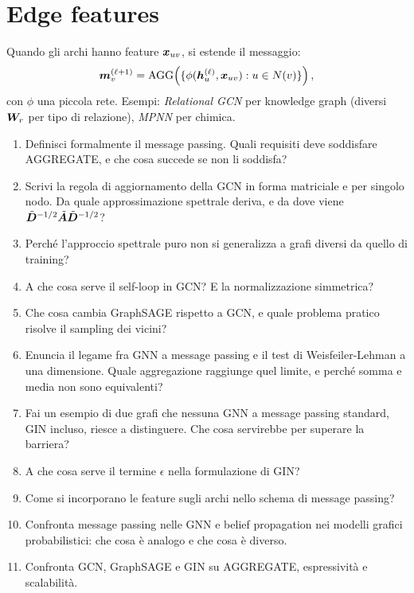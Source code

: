 \section{Edge features}

Quando gli archi hanno feature $\bm{x}_{uv}$, si estende il messaggio:
\[
\bm{m}_v^{(\ell+1)} = \mathrm{AGG}\!\left(\{\phi(\bm{h}_u^{(\ell)}, \bm{x}_{uv}) : u\in N(v)\}\right),
\]
con $\phi$ una piccola rete. Esempi: \emph{Relational GCN} per knowledge graph (diversi $\bm{W}_r$ per tipo di relazione), \emph{MPNN} per chimica.

\begin{tcolorbox}[mywarn, title={Domande d'esame — Message passing e GNN convoluzionali}]
\begin{enumerate}
  \item Definisci formalmente il message passing. Quali requisiti deve soddisfare AGGREGATE, e che cosa succede se non li soddisfa?
  \item Scrivi la regola di aggiornamento della GCN in forma matriciale e per singolo nodo. Da quale approssimazione spettrale deriva, e da dove viene $\tilde{\bm{D}}^{-1/2}\tilde{\bm{A}}\tilde{\bm{D}}^{-1/2}$?
  \item Perché l'approccio spettrale puro non si generalizza a grafi diversi da quello di training?
  \item A che cosa serve il self-loop in GCN? E la normalizzazione simmetrica?
  \item Che cosa cambia GraphSAGE rispetto a GCN, e quale problema pratico risolve il sampling dei vicini?
  \item Enuncia il legame fra GNN a message passing e il test di Weisfeiler-Lehman a una dimensione. Quale aggregazione raggiunge quel limite, e perché somma e media non sono equivalenti?
  \item Fai un esempio di due grafi che nessuna GNN a message passing standard, GIN incluso, riesce a distinguere. Che cosa servirebbe per superare la barriera?
  \item A che cosa serve il termine $\epsilon$ nella formulazione di GIN?
  \item Come si incorporano le feature sugli archi nello schema di message passing?
  \item Confronta message passing nelle GNN e belief propagation nei modelli grafici probabilistici: che cosa è analogo e che cosa è diverso.
  \item Confronta GCN, GraphSAGE e GIN su AGGREGATE, espressività e scalabilità.
\end{enumerate}
\end{tcolorbox}

